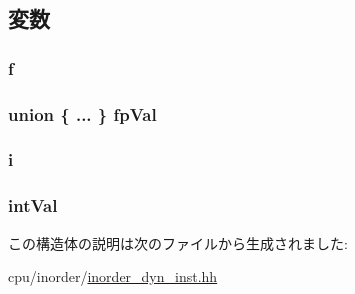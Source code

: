 \subsection{変数}
\hypertarget{structInOrderDynInst_1_1InstValue_a375c327a2546e9117ea4bc65b2bffb00}{
\subsubsection[{f}]{ {\bf f}}}
\label{structInOrderDynInst_1_1InstValue_a375c327a2546e9117ea4bc65b2bffb00}
\hypertarget{structInOrderDynInst_1_1InstValue_ab15928ea3a026aa98a87b6b6ef98c08b}{
\subsubsection[{fpVal}]{\setlength{\rightskip}{0pt plus 5cm}union \{ ... \}   {\bf fpVal}}}
\label{structInOrderDynInst_1_1InstValue_ab15928ea3a026aa98a87b6b6ef98c08b}
\hypertarget{structInOrderDynInst_1_1InstValue_ab76510481b35d98ae60b4a389d615f36}{
\subsubsection[{i}]{ {\bf i}}}
\label{structInOrderDynInst_1_1InstValue_ab76510481b35d98ae60b4a389d615f36}
\hypertarget{structInOrderDynInst_1_1InstValue_a9af9267a996a9e656af584e807cd8ca0}{
\subsubsection[{intVal}]{ {\bf intVal}}}
\label{structInOrderDynInst_1_1InstValue_a9af9267a996a9e656af584e807cd8ca0}


この構造体の説明は次のファイルから生成されました:\begin{DoxyCompactItemize}
\item 
cpu/inorder/\hyperlink{inorder__dyn__inst_8hh}{inorder\_\-dyn\_\-inst.hh}\end{DoxyCompactItemize}
